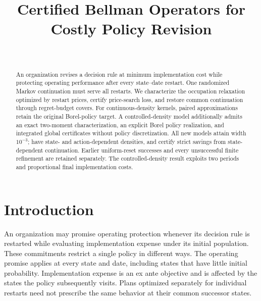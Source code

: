 



\begin{frontmatter}
\title{Certified Bellman Operators for Costly Policy Revision}
\begin{aug}\author[id=au1,addressref={add1}]{~}\address[id=add1]{}\end{aug}
\begin{abstract}
An organization revises a decision rule at minimum implementation cost while protecting operating performance after every state--date restart. One randomized Markov continuation must serve all restarts. We characterize the occupation relaxation optimized by restart prices, certify price-search loss, and restore common continuation through regret-budget covers. For continuous-density kernels, paired approximations retain the original Borel-policy target. A controlled-density model additionally admits an exact two-moment characterization, an explicit Borel policy realization, and integrated global certificates without policy discretization. All \CRCases{} new models attain width $10^{-3}$; \CRControls{} have state- and action-dependent densities, and \CRSavings{} certify strict savings from state-dependent continuation. Earlier uniform-reset successes and every unsuccessful finite refinement are retained separately. The controlled-density result exploits two periods and proportional final implementation costs.
\end{abstract}
\begin{keyword}\end{keyword}
\end{frontmatter}

\section{Introduction}\label{sec:intro50}
An organization may promise operating protection whenever its decision rule is restarted while evaluating implementation expense under its initial population. These commitments restrict a single policy in different ways. The operating promise applies at every state and date, including states that have little initial probability. Implementation expense is an ex ante objective and is affected by the states the policy subsequently visits. Plans optimized separately for individual restarts need not prescribe the same behavior at their common successor states.

